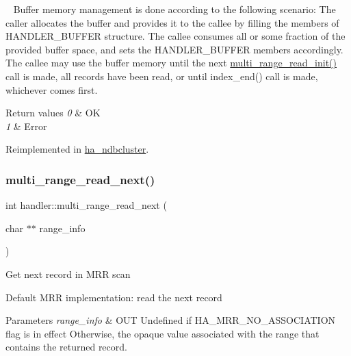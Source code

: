 ~\newline
 Buffer memory management is done according to the following scenario\+: The caller allocates the buffer and provides it to the callee by filling the members of H\+A\+N\+D\+L\+E\+R\+\_\+\+B\+U\+F\+F\+ER structure. The callee consumes all or some fraction of the provided buffer space, and sets the H\+A\+N\+D\+L\+E\+R\+\_\+\+B\+U\+F\+F\+ER members accordingly. The callee may use the buffer memory until the next \mbox{\hyperlink{classhandler_a33e8899f4bae262b6b91c7284f1d946e}{multi\+\_\+range\+\_\+read\+\_\+init()}} call is made, all records have been read, or until index\+\_\+end() call is made, whichever comes first.


\begin{DoxyRetVals}{Return values}
{\em 0} & OK \\
\hline
{\em 1} & Error \\
\hline
\end{DoxyRetVals}


Reimplemented in \mbox{\hyperlink{classha__ndbcluster_aba9c67b0e6bdfc66f40e30b0bccecabf}{ha\+\_\+ndbcluster}}.

\mbox{\label{classhandler_a3419071f3d4abf183dac95ef565adfff}} 
\subsubsection{\texorpdfstring{multi\+\_\+range\+\_\+read\+\_\+next()}{multi\_range\_read\_next()}}
{\footnotesize\ttfamily int handler\+::multi\+\_\+range\+\_\+read\+\_\+next (\begin{DoxyParamCaption}\item[{char $\ast$$\ast$}]{range\+\_\+info }\end{DoxyParamCaption})\hspace{0.3cm}{\ttfamily [virtual]}}

Get next record in M\+RR scan

Default M\+RR implementation\+: read the next record


\begin{DoxyParams}{Parameters}
{\em range\+\_\+info} & O\+UT Undefined if H\+A\+\_\+\+M\+R\+R\+\_\+\+N\+O\+\_\+\+A\+S\+S\+O\+C\+I\+A\+T\+I\+ON flag is in effect Otherwise, the opaque value associated with the range that contains the returned record.\\
\hline
\end{DoxyParams}

